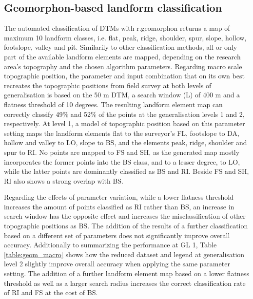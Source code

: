 \documentclass[final,1p,times,twocolumn,authoryear]{elsarticle}
\begin{document}
\subsection{Geomorphon-based landform classification}
The automated classification of DTMs with r.geomorphon returns a map of maximum 10 landform classes, i.e. flat, peak, ridge, shoulder, spur, slope, hollow, footslope, valley and pit. Similarily to other classification methods, all or only part of the available landform elements are mapped, depending on the research area's topography and the chosen algorithm parameters. 
Regarding macro scale topographic position, the parameter and input combination that on its own best recreates the topographic positions from field survey at both levels of generalisation is based on the 50 m DTM, a search window (L) of 400 m and a flatness threshold of 10 degrees. The resulting landform element map can correctly classify 49\% and 52\% of the points at the generalisation levels 1 and 2, respectively. At level 1, a model of topographic position based on this parameter setting maps the landform elements flat to the surveyor's FL, footslope to DA,  hollow and valley to LO, slope to BS, and the elements peak, ridge, shoulder and spur to RI. No points are mapped to FS and SH, as the generated map mostly incorporates the former points into the BS class, and to a lesser degree, to LO, while the latter points are dominantly classified as BS and RI. Beside FS  and SH, RI also shows a strong overlap with BS.

Regarding the effects of parameter variation, while a lower flatness threshold increases the amount of points classified as RI rather than BS, an increase in search window has the opposite effect and increases the misclassification of other topographic positions as BS. The addition of the results of a further classification based on a different set of parameters does not significantly improve overall accuracy. 
Additionally to summarizing the performance at GL 1, Table \ref{table:geom_macro} shows how the reduced dataset and legend at generalisation level 2 slightly improve overall accuracy when applying the same parameter setting. The addition of a further landform element map based on a lower flatness threshold as well as a larger search radius increases the correct classification rate of RI and FS at the cost of BS.
\end{document}
